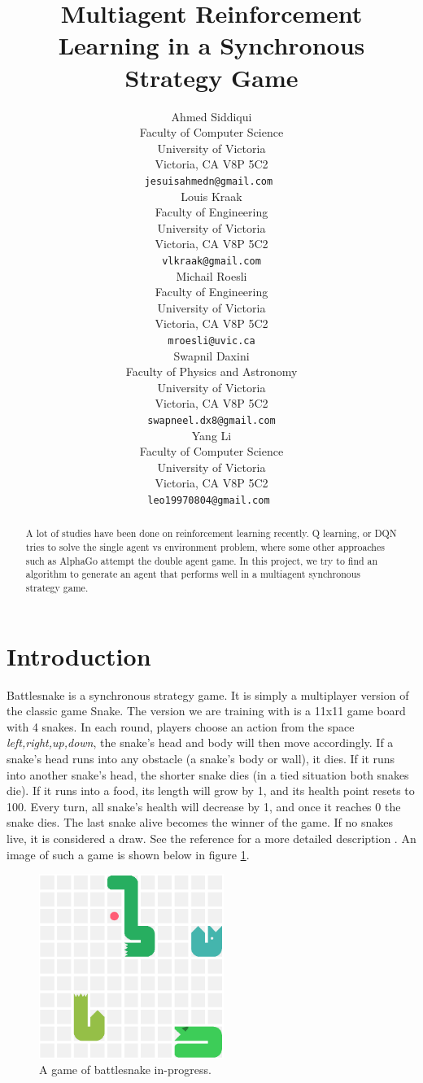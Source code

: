﻿\documentclass{article}
\title{Multiagent Reinforcement Learning in a Synchronous Strategy Game}
\author{%
  Ahmed Siddiqui \\
  Faculty of Computer Science\\
  University of Victoria\\
  Victoria, CA V8P 5C2 \\
  \texttt{jesuisahmedn@gmail.com } \\
  \And
  Louis Kraak  \\
  Faculty of Engineering \\
  University of Victoria \\
  Victoria, CA V8P 5C2 \\
  \texttt{vlkraak@gmail.com} \\
  \And
  Michail Roesli  \\
  Faculty of Engineering \\
  University of Victoria \\
  Victoria, CA V8P 5C2 \\
  \texttt{mroesli@uvic.ca} \\
  \And
  Swapnil Daxini  \\
  Faculty of Physics and Astronomy \\
  University of Victoria \\
  Victoria, CA V8P 5C2 \\
  \texttt{swapneel.dx8@gmail.com} \\
  \And
  Yang Li  \\
  Faculty of Computer Science \\
  University of Victoria \\
  Victoria, CA V8P 5C2 \\
  \texttt{leo19970804@gmail.com } \\
}
\begin{document}
\maketitle

\begin{abstract}
  A lot of studies have been done on reinforcement learning recently. Q
  learning, or DQN tries to solve the single agent vs environment problem, where
  some other approaches such as AlphaGo attempt the double agent game. In this
  project, we try to find an algorithm to generate an agent that performs well
  in a multiagent synchronous strategy game.
\end{abstract}

\section{Introduction}

Battlesnake is a synchronous strategy game. It is simply a multiplayer version
of the classic game Snake. The version we are training with is a 11x11 game
board with 4 snakes. In each round, players choose an action from the space
\textit{left,right,up,down}, the snake’s head and body will then move accordingly. If
a snake’s head runs into any obstacle (a snake’s body or wall), it dies. If it
runs into another snake’s head, the shorter snake dies (in a tied situation both
snakes die). If it runs into a food, its length will grow by 1, and its health
point resets to 100. Every turn, all snake’s health will decrease by 1, and once
it reaches 0 the snake dies. The last snake alive becomes the winner of the
game. If no snakes live, it is considered a draw. See the reference for a more
detailed description \cite{BattlesnakeDoc}. An image of such a game is shown
below in figure \ref{fig:snake}.


\begin{figure}[!ht]
  \centering
  \includegraphics[width=6cm]{snake}
  \caption{A game of battlesnake in-progress.}
  \label{fig:snake}
\end{figure}
\end{document}
